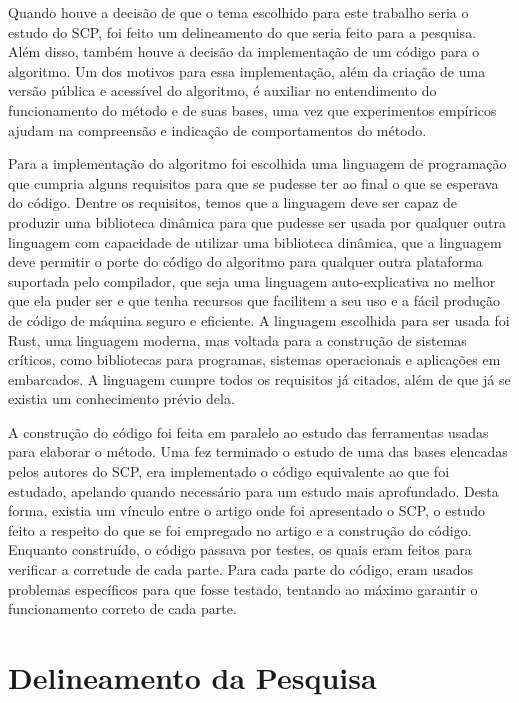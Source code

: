 Quando houve a decisão de que o tema escolhido para este trabalho seria o estudo do SCP, foi feito um delineamento do que seria feito para a pesquisa. Além disso, também houve a decisão da implementação de um código para o algoritmo. Um dos motivos para essa implementação, além da criação de uma versão pública e acessível do algoritmo, é auxiliar no entendimento do funcionamento do método e de suas bases, uma vez que experimentos empíricos ajudam na compreensão e indicação de comportamentos do método.

Para a implementação do algoritmo foi escolhida uma linguagem de programação que cumpria alguns requisitos para que se pudesse ter ao final o que se esperava do código. Dentre os requisitos, temos que a linguagem deve ser capaz de produzir uma biblioteca dinâmica para que pudesse ser usada por qualquer outra linguagem com capacidade de utilizar uma biblioteca dinâmica, que a linguagem deve permitir o porte do código do algoritmo para qualquer outra plataforma suportada pelo compilador, que seja uma linguagem auto-explicativa no melhor que ela puder ser e que tenha recursos que facilitem a seu uso e a fácil produção de código de máquina seguro e eficiente. A linguagem escolhida para ser usada foi Rust, uma linguagem moderna, mas voltada para a construção de sistemas críticos, como bibliotecas para programas, sistemas operacionais e aplicações em embarcados. A linguagem cumpre todos os requisitos já citados, além de que já se existia um conhecimento prévio dela.

A construção do código foi feita em paralelo ao estudo das ferramentas usadas para elaborar o método. Uma fez terminado o estudo de uma das bases elencadas pelos autores do SCP, era implementado o código equivalente ao que foi estudado, apelando quando necessário para um estudo mais aprofundado. Desta forma, existia um vínculo entre o artigo onde foi apresentado o SCP, o estudo feito a respeito do que se foi empregado no artigo e a construção do código. Enquanto construído, o código passava por testes, os quais eram feitos para verificar a corretude de cada parte. Para cada parte do código, eram usados problemas específicos para que fosse testado, tentando ao máximo garantir o funcionamento correto de cada parte.

\section{Delineamento da Pesquisa}
\label{sec:titSecDelPesq}



